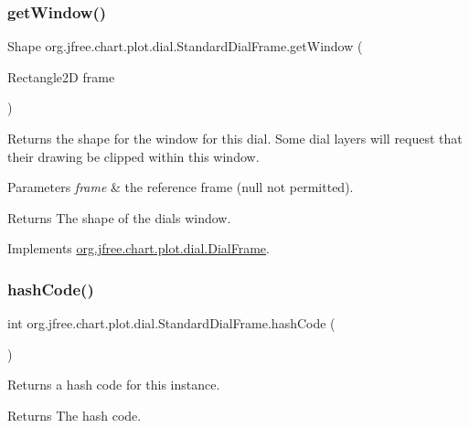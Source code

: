 \subsubsection{\texorpdfstring{get\+Window()}{getWindow()}}
{\footnotesize\ttfamily Shape org.\+jfree.\+chart.\+plot.\+dial.\+Standard\+Dial\+Frame.\+get\+Window (\begin{DoxyParamCaption}\item[{Rectangle2D}]{frame }\end{DoxyParamCaption})}

Returns the shape for the window for this dial. Some dial layers will request that their drawing be clipped within this window.


\begin{DoxyParams}{Parameters}
{\em frame} & the reference frame ({\ttfamily null} not permitted).\\
\hline
\end{DoxyParams}
\begin{DoxyReturn}{Returns}
The shape of the dial\textquotesingle{}s window. 
\end{DoxyReturn}


Implements \mbox{\hyperlink{interfaceorg_1_1jfree_1_1chart_1_1plot_1_1dial_1_1_dial_frame_ad7f7696c45b0af4fe283d16a0a630d60}{org.\+jfree.\+chart.\+plot.\+dial.\+Dial\+Frame}}.

\mbox{\label{classorg_1_1jfree_1_1chart_1_1plot_1_1dial_1_1_standard_dial_frame_a51700e94f82ad54d768647628ead4c20}} 
\subsubsection{\texorpdfstring{hash\+Code()}{hashCode()}}
{\footnotesize\ttfamily int org.\+jfree.\+chart.\+plot.\+dial.\+Standard\+Dial\+Frame.\+hash\+Code (\begin{DoxyParamCaption}{ }\end{DoxyParamCaption})}

Returns a hash code for this instance.

\begin{DoxyReturn}{Returns}
The hash code. 
\end{DoxyReturn}
\mbox{\label{classorg_1_1jfree_1_1chart_1_1plot_1_1dial_1_1_standard_dial_frame_a3d7725c15ddb58b403492a1f4f48a24a}} 
